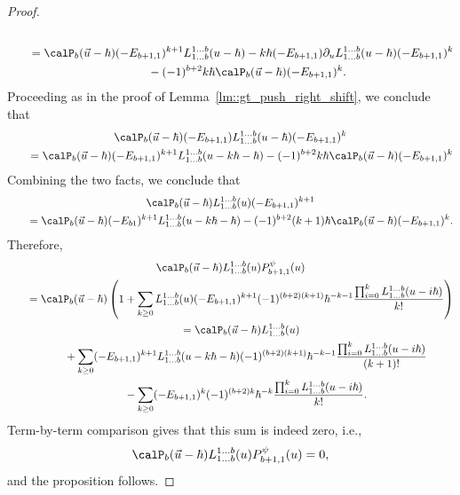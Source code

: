 \begin{Proposition}
\begin{proof}
\begin{gather*}
 \\
				\qquad= \calP_{b}(\vec{u}-\hbar) (-E_{b+1,1})^{k+1} L_{1\dots b}^{1\dots b}(u-\hbar) - k\hbar (-E_{b+1,1}) \partial_u L_{1\dots b}^{1\dots b}(u-\hbar) (-E_{b+1,1})^k \\
				\phantom{\qquad=}{}- (-1)^{b+2} k\hbar \calP_{b}(\vec{u}-\hbar) (-E_{b+1,1})^k.
			\end{gather*}
			Proceeding as in the proof of Lemma~\ref{lm::gt_push_right_shift}, we conclude that
			\begin{gather*}
				\calP_{b}(\vec{u}-\hbar) (-E_{b+1,1}) L_{1\dots b}^{1\dots b}(u-\hbar) (-E_{b+1,1})^{k} \\
				\qquad=\calP_{b}(\vec{u}-\hbar) (-E_{b+1,1})^{k+1} L_{1\dots b}^{1\dots b}(u-k\hbar-\hbar) - (-1)^{b+2} k\hbar \calP_{b}(\vec{u}-\hbar) (-E_{b+1,1})^k
			\end{gather*}
			Combining the two facts, we conclude that
			\begin{gather*}
				\calP_{b}(\vec{u}-\hbar) L_{1\dots b}^{1\dots b}(u) (-E_{b+1,1})^{k+1} \\
			\qquad	= \calP_{b}(\vec{u}-\hbar) (-E_{b1})^{k+1} L_{1\dots b}^{1\dots b} (u-k\hbar-\hbar) - (-1)^{b+2} (k+1)\hbar \calP_{b}(\vec{u}-\hbar) (-E_{b+1,1})^k.
			\end{gather*}
			Therefore,
			\begin{gather*}
				\calP_{b}(\vec{u}-\hbar) L_{1\dots b}^{1\dots b}(u) P_{b+1,1}^{\psi}(u) \\
				\qquad= \calP_{b}(\vec{u}-\hbar) \left( 1 + \sum\limits_{k\geq 0} L_{1\dots b}^{1\dots b}(u) (-E_{b+1,1})^{k+1} (-1)^{(b+2)(k+1)} \hbar^{-k-1} \frac{\prod_{i=0}^{k} L_{1\dots b}^{1\dots b}(u-i\hbar)}{k!} \right)\\
				\qquad= \calP_{b}(\vec{u}-\hbar) L_{1\dots b}^{1\dots b}(u) \\
			\phantom{\qquad=}{}	+\sum\limits_{k\geq 0} (-E_{b+1,1})^{k+1} L_{1\dots b}^{1\dots b}(u-k\hbar-\hbar) (-1)^{(b+2)(k+1)} \hbar^{-k-1} \frac{\prod_{i=0}^{k} L_{1\dots b}^{1\dots b}(u-i\hbar)}{(k+1)!} \\
			\phantom{\qquad=}{}	- \sum\limits_{k\geq 0} (-E_{b+1,1})^k (-1)^{(b+2)k} \hbar^{-k} \frac{\prod_{i=0}^{k} L_{1\dots b}^{1\dots b}(u-i\hbar)}{k!}.
			\end{gather*}
			Term-by-term comparison gives that this sum is indeed zero, i.e.,
			\[
			\calP_{b}(\vec{u}-\hbar) L_{1\dots b}^{1\dots b}(u) P_{b+1,1}^{\psi}(u) = 0,
			\]
			and the proposition follows.
		\end{proof}
	\end{Proposition}
	
